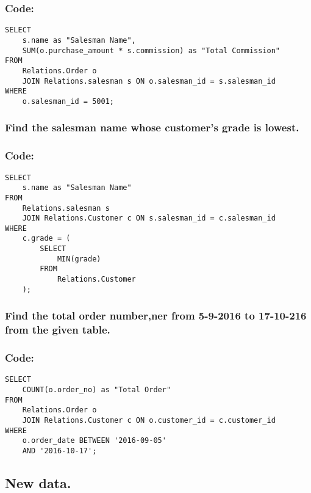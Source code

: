 \documentclass[12pt]{article}
\begin{document}
\subsubsection*{Code: }
\begin{verbatim}
SELECT
    s.name as "Salesman Name",
    SUM(o.purchase_amount * s.commission) as "Total Commission"
FROM
    Relations.Order o
    JOIN Relations.salesman s ON o.salesman_id = s.salesman_id
WHERE
    o.salesman_id = 5001;
\end{verbatim}

\vspace{10mm}

\subsubsection{Find the salesman name whose customer’s grade is lowest.}
\subsubsection*{Code: }
\begin{verbatim}
SELECT
    s.name as "Salesman Name"
FROM
    Relations.salesman s
    JOIN Relations.Customer c ON s.salesman_id = c.salesman_id
WHERE
    c.grade = (
        SELECT
            MIN(grade)
        FROM
            Relations.Customer
    );
\end{verbatim}
\vspace{10mm}

\subsubsection{Find the total order number,ner from 5-9-2016 to 17-10-216 from the given table.}
\subsubsection*{Code: }
\begin{verbatim}
SELECT
    COUNT(o.order_no) as "Total Order"
FROM
    Relations.Order o
    JOIN Relations.Customer c ON o.customer_id = c.customer_id
WHERE
    o.order_date BETWEEN '2016-09-05'
    AND '2016-10-17';
\end{verbatim}
\vspace{10mm}

\subsection{New data.}
\end{document}
